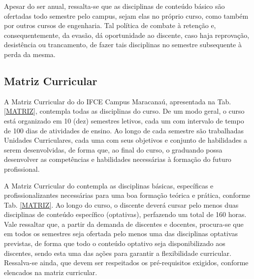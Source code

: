 \documentclass{paper}
\begin{document}
\fi

Apesar do \NOMECURSO ser anual, ressalta-se que as disciplinas de conteúdo básico são ofertadas todo semestre pelo campus, sejam elas no próprio curso, como também por outros cursos de engenharia. Tal política de combate à retenção e, consequentemente, da evasão, dá oportunidade ao discente, caso haja reprovação, desistência ou trancamento, de fazer tais disciplinas no semestre subsequente à perda da mesma. 

\subsection{Matriz Curricular}


A Matriz Curricular do \NOMECURSO do IFCE Campus Maracanaú, apresentada na Tab. \ref{MATRIZ}, contempla todas as disciplinas do curso. De um modo geral, o curso está organizado em 10 (dez) semestres letivos, cada um com intervalo de tempo de 100 dias de atividades de ensino. Ao longo de cada semestre são trabalhadas Unidades Curriculares, cada uma com seus objetivos e conjunto de habilidades a serem desenvolvidas, de forma que, ao final do curso, o graduando possa desenvolver as competências e habilidades necessárias à formação do futuro profissional.

A Matriz Curricular do \NOMECURSO contempla as disciplinas básicas, específicas e profissionalizantes necessárias para uma boa formação teórica e prática, conforme Tab. \ref{MATRIZ}. Ao longo do curso, o discente deverá cursar pelo menos duas disciplinas de conteúdo específico (optativas), perfazendo um total de 160 horas. Vale ressaltar que, a partir da demanda de discentes e docentes, procura-se que em todos os semestres seja ofertada pelo menos uma das disciplinas optativas previstas, de forma que todo o conteúdo optativo seja disponibilizado aos discentes, sendo esta uma das ações para garantir a flexibilidade curricular. Ressalva-se ainda, que devem ser respeitados os pré-requisitos exigidos, conforme elencados na matriz curricular.

\end{document}
